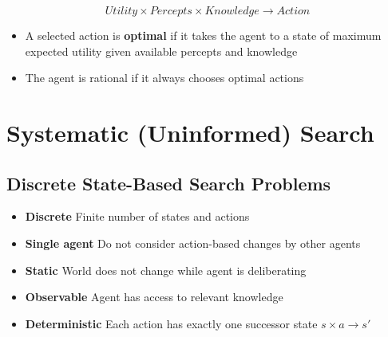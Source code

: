 \documentclass[conference, a4paper]{styles/acmsiggraph}
\begin{document}
        $$Utility \times Percepts \times Knowledge \longrightarrow Action$$
        
        \begin{itemize}
            \item A selected action is \textbf{optimal} if it takes the agent to a state of maximum expected utility given available percepts and knowledge
            \item The agent is rational if it always chooses optimal actions
        \end{itemize}
        
        
        
        
        
        
        
\section{Systematic (Uninformed) Search}
    
    \subsection{Discrete State-Based Search Problems}
        \begin{itemize}
            \item \textbf{Discrete}\newline
                Finite number of states and actions
            \item \textbf{Single agent}\newline
                Do not consider action-based changes by other agents
            \item \textbf{Static}\newline
                World does not change while agent is deliberating
            \item \textbf{Observable}\newline
                Agent has access to relevant knowledge
            \item \textbf{Deterministic}\newline
                Each action has exactly one successor state $s \times a \longrightarrow s'$
        \end{itemize}
    
\end{document}
